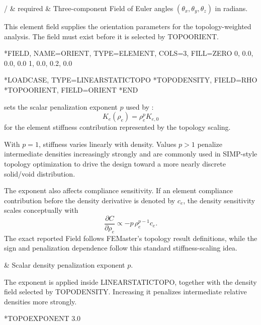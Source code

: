 \begin{keywordparameters}
 /  & required & Three-component  Field of Euler angles \((\theta_x,\theta_y,\theta_z)\) in radians. \\
\end{keywordparameters}

This element field supplies the orientation parameters for the topology-weighted analysis. The field must exist before it is selected by TOPOORIENT.

\exampleheading
\begin{inputdeck}
*FIELD, NAME=ORIENT,
 TYPE=ELEMENT, COLS=3, FILL=ZERO
0, 0.0, 0.0, 0.0
1, 0.0, 0.2, 0.0

*LOADCASE, TYPE=LINEARSTATICTOPO
*TOPODENSITY, FIELD=RHO
*TOPOORIENT, FIELD=ORIENT
*END
\end{inputdeck}


 sets the scalar penalization exponent \(p\) used by :
\[
K_e(\rho_e)=\rho_e^p K_{e,0}
\]
for the element stiffness contribution represented by the topology scaling.

With \(p=1\), stiffness varies linearly with density. Values \(p>1\) penalize intermediate densities increasingly strongly and are commonly used in SIMP-style topology optimization to drive the design toward a more nearly discrete solid/void distribution.

The exponent also affects compliance sensitivity. If an element compliance contribution before the density derivative is denoted by \(c_e\), the density sensitivity scales conceptually with
\[
\frac{\partial C}{\partial\rho_e}
\propto -p\,\rho_e^{p-1}c_e.
\]
The exact reported Field follows FEMaster's topology result definitions, while the sign and penalization dependence follow this standard stiffness-scaling idea.

\begin{keyworddata}
 & Scalar density penalization exponent \(p\). \\
\end{keyworddata}

The exponent is applied inside LINEARSTATICTOPO, together with the density field selected by TOPODENSITY. Increasing it penalizes intermediate relative densities more strongly.

\exampleheading
\begin{inputdeck}
*TOPOEXPONENT
3.0
\end{inputdeck}
